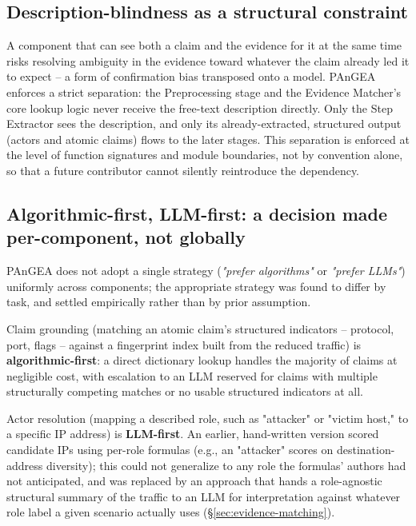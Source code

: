 \documentclass[sigconf,nonacm]{acmart}
\begin{document}
\subsection{Description-blindness as a structural constraint}
\label{sec:r2}

A component that can see both a claim and the evidence for it at the same time
risks resolving ambiguity in the evidence toward whatever the claim already
led it to expect -- a form of confirmation bias transposed onto a model. PAnGEA
enforces a strict separation: the Preprocessing stage and the Evidence Matcher's
core lookup logic never receive the free-text description directly. Only the
Step Extractor sees the description, and only its already-extracted, structured
output (actors and atomic claims) flows to the later stages. This separation is
enforced at the level of function signatures and module boundaries, not by
convention alone, so that a future contributor cannot silently reintroduce the
dependency.

\subsection{Algorithmic-first, LLM-first: a decision made per-component, not globally}
\label{sec:hybrid}

PAnGEA does not adopt a single strategy (\emph{"prefer algorithms"} or
\emph{"prefer LLMs"}) uniformly across components; the appropriate strategy was
found to differ by task, and settled empirically rather than by prior
assumption.

Claim grounding (matching an atomic claim's structured indicators --
protocol, port, flags -- against a fingerprint index built from the reduced
traffic) is \textbf{algorithmic-first}: a direct dictionary lookup handles the
majority of claims at negligible cost, with escalation to an LLM reserved for
claims with multiple structurally competing matches or no usable structured
indicators at all.

Actor resolution (mapping a described role, such as "attacker" or "victim
host," to a specific IP address) is \textbf{LLM-first}. An earlier,
hand-written version scored candidate IPs using per-role formulas (e.g., an
"attacker" scores on destination-address diversity); this could not generalize
to any role the formulas' authors had not anticipated, and was replaced by an
approach that hands a role-agnostic structural summary of the traffic to an
LLM for interpretation against whatever role label a given scenario actually
uses (\S\ref{sec:evidence-matching}).
\end{document}
